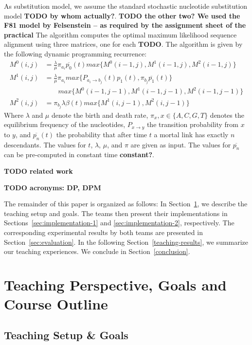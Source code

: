 \documentclass[runningheads,a4paper]{llncs}
\begin{document}
As substitution model, we assume the standard stochastic nucleotide substitution model {\bf TODO by whom actually?}. 
{\bf TODO the other two? We used the F81 model by Felsenstein -- as required by the assignment sheet of the practical}
The algorithm computes the optimal maximum likelihood sequence alignment using three matrices, one for each {\bf TODO}.
The algorithm is given by the following dynamic programming recurrence: 
\[
\begin{aligned}
  M^0(i,j)&=\frac{\lambda}{\mu}\pi_{a_i}\overline{p_0}(t)max\{M^0(i-1, j), M^1(i-1,j), M^2(i-1,j)\}\\
  M^1(i,j)&=\frac{\lambda}{\mu}\pi_{a_i}max\{P_{a_i \rightarrow b_j}(t) p_1(t), \pi_{b_j}\overline{p_1}(t)\}\\
          &\quad\quad max\{M^0(i-1, j-1), M^1(i-1,j-1), M^2(i-1,j-1)\}\\
  M^2(i,j)&=\pi_{b_j}\lambda\beta(t)max\{M^1(i,j-1), M^2(i,j-1)\}
\end{aligned}
\]
Where $\lambda$ and $\mu$ denote the birth and death rate, $\pi_x, x \in \{A,C,G,T\}$ denotes the equilibrium frequency of the nucleotides, 
$P_{x \rightarrow y}$ the transition probability from $x$ to $y$, and $\overline{p_n}(t)$ the probability that after time $t$ a mortal link has exactly $n$ descendants. 
The values for $t$, $\lambda$, $\mu$, and $\pi$ are given as input. 
The values for $\overline{p_n}$ can be pre-computed in constant time {\bf constant?}.

{\bf TODO related work} 

{\bf TODO acronyms: DP, DPM} 

The remainder of this paper is organized as follows: In Section~\ref{teaching}, we describe the teaching setup and goals. 
The teams then present their implementations in Sections~\ref{sec:implementation-1} and \ref{sec:implementation-2}, respectively. 
The corresponding experimental results by both teams are presented in Section~\ref{sec:evaluation}.
In the following Section~\ref{teaching-results}, we summarize our teaching experiences.
We conclude in Section~\ref{conclusion}.

\section{Teaching Perspective, Goals and Course Outline}
\label{teaching} 

\subsection{Teaching Setup \& Goals} 
\end{document}

